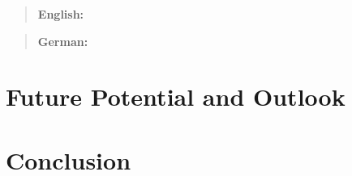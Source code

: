 \documentclass[12pt, a4paper]{article}
\begin{document}



\maketitle
\begin{otherlanguage}{english}
    \begin{abstract}
        \textbf{English:} \lipsum[20]
    \end{abstract}
\end{otherlanguage}
\begin{otherlanguage}{ngerman}
    \begin{abstract}
        \textbf{German:} \lipsum[20]
    \end{abstract}
\end{otherlanguage}
\newpage

\tableofcontents
\newpage

\setcounter{lastroman}{\value{page}}















\section{Future Potential and Outlook}\label{sec::outlook}
\section{Conclusion}\label{sec::conclusion}

\end{document}
